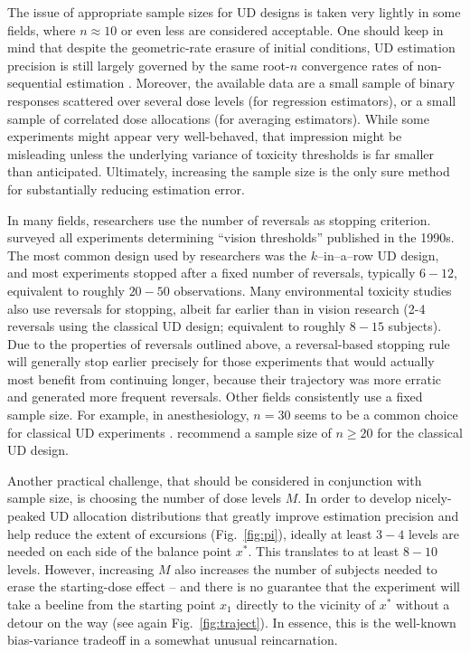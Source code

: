 The issue of appropriate sample sizes for UD designs is taken very lightly in some fields, where $n\approx 10$ or even less are considered acceptable. One should keep in mind that despite the geometric-rate erasure of initial conditions, UD estimation precision is still largely governed by the same root-$n$ convergence rates of non-sequential estimation \citep[Section~1.2]{Oron07} . Moreover, the available data are a small sample of binary responses scattered over several dose levels (for regression estimators), or a small sample of correlated dose allocations (for averaging estimators). While some experiments might appear very well-behaved, that impression might be misleading unless the underlying variance of toxicity thresholds is far smaller than anticipated. Ultimately, increasing the sample size is the only sure method for substantially reducing estimation error.

In many fields, researchers use the number of reversals  as stopping criterion. \cite{Garc:Pere:Forc:1998} surveyed all experiments determining ``vision thresholds'' published in the 1990s. The most common design used by researchers was the $k$--in--a--row UD design, and most experiments stopped after a fixed number of reversals, typically $6-12$, equivalent to roughly $20-50$ observations. Many environmental toxicity studies also use reversals for stopping, albeit far earlier than in vision research (2-4 reversals using the classical UD design; equivalent to roughly $8-15$ subjects). Due to the properties of reversals outlined above, a reversal-based stopping rule will generally stop earlier precisely for those experiments that would actually most benefit from continuing longer, because their trajectory was more erratic and generated more frequent reversals. Other fields consistently use a fixed sample size. For example, in anesthesiology, $n=30$ seems to be a common choice for classical UD experiments \citep{Capo:Parp:Lyon:Colu:Cell:Mini:2001,Camo:Capo:Lyon:Colu:Epid:2004}. \cite{Pace:styl:tutor:2007} recommend a sample size of $n\geq 20$ for the classical UD design.

Another practical challenge, that should be considered in conjunction with sample size, is choosing the number of dose levels $M$. In order to develop nicely-peaked UD allocation distributions that greatly improve estimation precision and help reduce the extent of excursions (Fig.~\ref{fig:pi}), ideally at least $3-4$ levels are needed on each side of the balance point $x^*$. This translates to at least $8-10$ levels. However, increasing $M$ also increases the number of subjects needed to erase the starting-dose effect -- and there is no guarantee that the experiment will take a beeline from the starting point $x_1$ directly to the vicinity of $x^*$ without a detour on the way (see again Fig.~\ref{fig:traject}).  In essence, this is the well-known bias-variance tradeoff in a somewhat unusual reincarnation.


